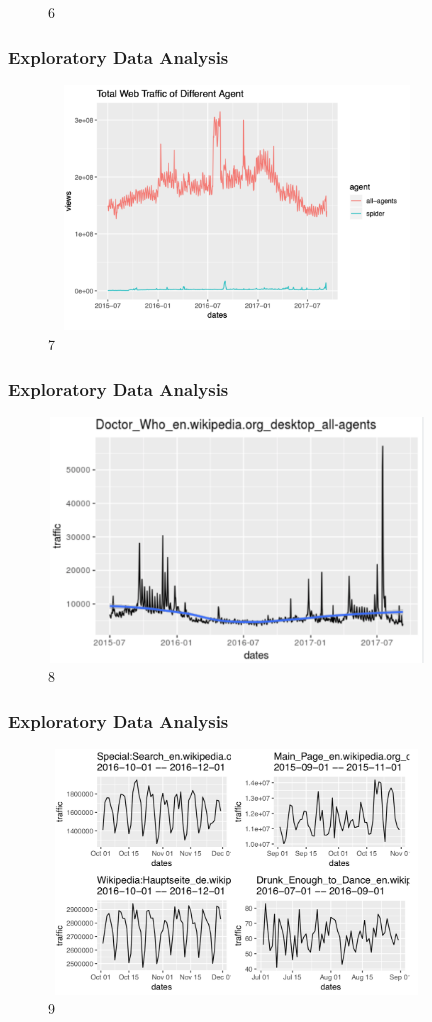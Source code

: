 \documentclass[cjk,10pt]{beamer}
\begin{document}
\begin{CJK*}{GBK}{song}
\begin{frame}
\begin{figure}[htbp]
\caption{6}
\end{figure}
       \end{frame}
            \begin{frame}
        \frametitle{Exploratory Data Analysis}
    \begin{figure}[htbp]
\centering
\includegraphics[height=6.5cm, width=10cm]{7}
\caption{7}
\end{figure}
       \end{frame}
             \begin{frame}
        \frametitle{Exploratory Data Analysis}
    \begin{figure}[htbp]
\centering
\includegraphics[height=6.5cm, width=10cm]{8}
\caption{8}
\end{figure}
       \end{frame}
              \begin{frame}
        \frametitle{Exploratory Data Analysis}
    \begin{figure}[htbp]
\centering
\includegraphics[height=6.5cm, width=10cm]{9}
\caption{9}
\end{figure}
       \end{frame}      

\end{CJK*}
\end{document}
